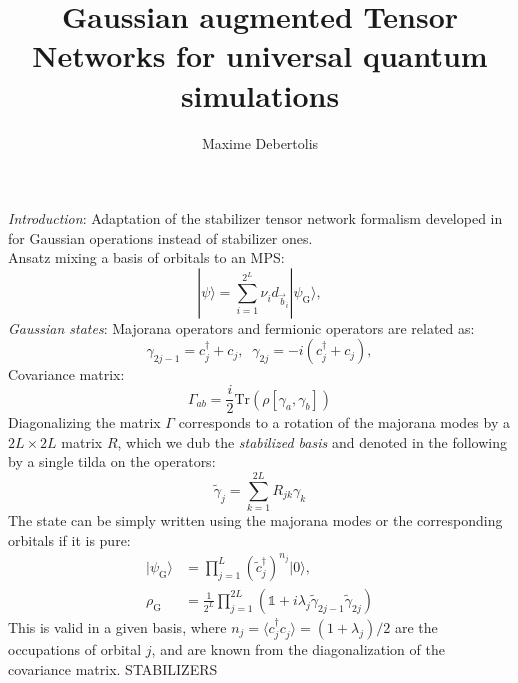 \documentclass[a4paper, twocolumn, superscriptaddress, longbibliography]{revtex4-2}
\begin{document}
	\author{Maxime Debertolis}
	\title{Gaussian augmented Tensor Networks for universal quantum simulations}

	\begin{abstract}

	\end{abstract}

	\maketitle

	\emph{Introduction}: Adaptation of the stabilizer tensor network formalism developed in~\cite{Masot_Llima_2024} for Gaussian operations instead of stabilizer ones. \\
	
	Ansatz mixing a basis of orbitals to an MPS:
	\begin{equation}
		|\psi \rangle = \sum_{i=1}^{2^{L}} \nu_i^{} d_{\vec{b}_i}^{} |\psi_{\mathrm{G}}^{}\rangle,
	\end{equation}
	\emph{Gaussian states}:
	Majorana operators and fermionic operators are related as:
	\begin{equation}
		\gamma_{2j-1} = c^{\dagger}_{j} + c_{j}, \;\;
		\gamma_{2j} = -i ( c^{\dagger}_{j} + c_{j}),
	\end{equation}
	Covariance matrix: 
	\begin{equation}
		\Gamma_{ab}^{} = \frac{i}{2} \mathrm{Tr}\left(\rho[\gamma_a^{},\gamma_b^{}] \right)
	\end{equation}
	Diagonalizing the matrix $\Gamma$ corresponds to a rotation of the majorana modes by a $2L\times2L$ matrix $R$, which we dub the \emph{stabilized basis} and denoted in the following by a single tilda on the operators:
	\begin{equation}
		\tilde{\gamma}_j = \sum_{k=1}^{2L} R_{jk}\gamma_{k}
	\end{equation}
	The state can be simply written using the majorana modes or the corresponding orbitals if it is pure:
	\begin{equation}
		\begin{split}
			|\psi_{\mathrm{G}}\rangle &= \prod_{j=1}^{L}\left(\tilde{c}_{j}^{\dagger}\right)^{n_j}|0\rangle, \\
			\rho_{\mathrm{G}}^{} &= \frac{1}{2^{L}}\prod\limits_{j=1}^{2L}\left(\mathds{1} + i\lambda_{j} \tilde{\gamma}_{2j-1}^{} \tilde{\gamma}_{2j}^{} \right)
		\end{split}
	\end{equation}
	This is valid in a given basis, where $n_j=\langle c^{\dagger}_j c^{}_j\rangle=(1+\lambda_j)/2$ are the occupations of orbital $j$, and are known from the diagonalization of the covariance matrix. STABILIZERS
\end{document}

